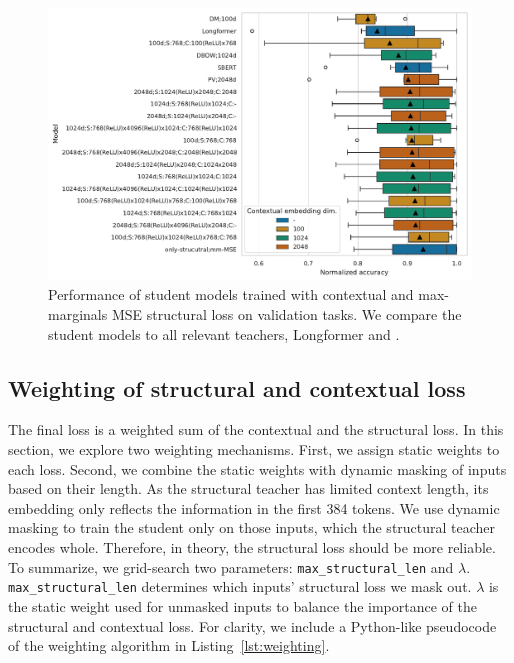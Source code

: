 \begin{figure}

  \includegraphics[width=\textwidth]{img/projections_contextual_mm_mse.pdf}

  \caption{Performance of student models trained with contextual and
  max-marginals MSE structural loss on validation tasks. We compare the student
  models to all relevant teachers, Longformer and
  .}

  \label{fig:mm_mse_contextual_projections}

\end{figure}

\subsection{Weighting of structural and contextual
loss}\label{section:weighting_experiments}

The final loss is a weighted sum of the contextual and the structural loss. In
this section, we explore two weighting mechanisms. First, we assign static
weights to each loss. Second, we combine the static weights with dynamic
masking of inputs based on their length. As the structural teacher has limited
context length, its embedding only reflects the information in the first 384
tokens. We use dynamic masking to train the student only on those inputs, which
the structural teacher encodes whole. Therefore, in theory, the structural loss
should be more reliable. To summarize, we grid-search two parameters: \texttt{max\_structural\_len} and $\lambda$.
\texttt{max\_structural\_len} determines which inputs' structural loss we
mask out. $\lambda$ is the static weight used for unmasked inputs to
balance the importance of the structural and contextual loss. For clarity, we
include a Python-like pseudocode of the weighting algorithm in
Listing~\ref{lst:weighting}.


